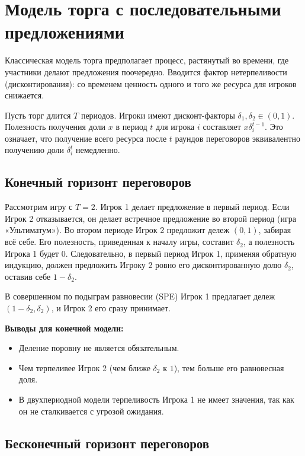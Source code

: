\section{Модель торга с последовательными предложениями}

Классическая модель торга предполагает процесс, растянутый во времени, где участники делают предложения поочередно. Вводится фактор нетерпеливости (дисконтирования): со временем ценность одного и того же ресурса для игроков снижается.

Пусть торг длится $T$ периодов. Игроки имеют дисконт-факторы $\delta_1, \delta_2 \in (0, 1)$. Полезность получения доли $x$ в период $t$ для игрока $i$ составляет $x \delta_i^{t-1}$. Это означает, что получение всего ресурса после $t$ раундов переговоров эквивалентно получению доли $\delta_i^t$ немедленно.

\subsection{Конечный горизонт переговоров}

Рассмотрим игру с $T=2$. Игрок 1 делает предложение в первый период. Если Игрок 2 отказывается, он делает встречное предложение во второй период (игра «Ультиматум»).
Во втором периоде Игрок 2 предложит дележ $(0, 1)$, забирая всё себе. Его полезность, приведенная к началу игры, составит $\delta_2$, а полезность Игрока 1 будет $0$.
Следовательно, в первый период Игрок 1, применяя обратную индукцию, должен предложить Игроку 2 ровно его дисконтированную долю $\delta_2$, оставив себе $1 - \delta_2$.

В совершенном по подыграм равновесии (SPE) Игрок 1 предлагает дележ $(1 - \delta_2, \delta_2)$, и Игрок 2 его сразу принимает. 

\textbf{Выводы для конечной модели:}
\begin{itemize}
    \item Деление поровну не является обязательным.
    \item Чем терпеливее Игрок 2 (чем ближе $\delta_2$ к $1$), тем больше его равновесная доля.
    \item В двухпериодной модели терпеливость Игрока 1 не имеет значения, так как он не сталкивается с угрозой ожидания.
\end{itemize}

\subsection{Бесконечный горизонт переговоров}

